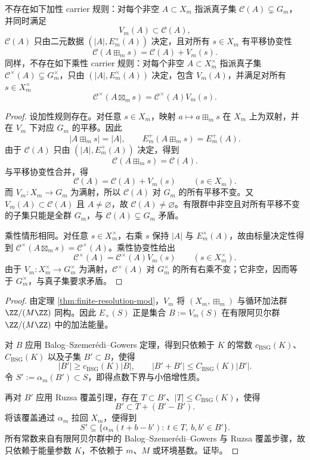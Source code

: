 \begin{proposition}[碰撞标量伪不变量剔除]\label{distill:breuillard_green_tao_approximate_groups_and_helfgott_growth-arithmetic_coincidence_to_model_theorem-collision-scalar-pseudoinvariant-elimination}
不存在如下加性 carrier 规则：对每个非空 \(A\subset X_m\) 指派真子集 \(\mathcal C(A)\subsetneq G_m\)，并同时满足
\[
V_m(A)\subset \mathcal C(A),
\]
\(\mathcal C(A)\) 只由二元数据 \((|A|,E_m^+(A))\) 决定，且对所有 \(s\in X_m\) 有平移协变性
\[
\mathcal C(A\boxplus_m s)=\mathcal C(A)+V_m(s).
\]
同样，不存在如下乘性 carrier 规则：对每个非空 \(A\subset X_m^\times\) 指派真子集 \(\mathcal C^\times(A)\subsetneq G_m^\times\)，只由 \((|A|,E_m^\times(A))\) 决定，包含 \(V_m(A)\)，并满足对所有 \(s\in X_m^\times\)
\[
\mathcal C^\times(A\boxtimes_m s)=\mathcal C^\times(A)V_m(s).
\]
\end{proposition}
\begin{proof}
设加性规则存在。对任意 \(s\in X_m\)，映射 \(a\mapsto a\boxplus_m s\) 在 \(X_m\) 上为双射，并在 \(V_m\) 下对应 \(G_m\) 的平移。因此
\[
|A\boxplus_m s|=|A|,\qquad E_m^+(A\boxplus_m s)=E_m^+(A).
\]
由于 \(\mathcal C(A)\) 只由 \((|A|,E_m^+(A))\) 决定，得到
\[
\mathcal C(A\boxplus_m s)=\mathcal C(A).
\]
与平移协变性合并，得
\[
\mathcal C(A)=\mathcal C(A)+V_m(s)\qquad(s\in X_m).
\]
而 \(V_m:X_m\to G_m\) 为满射，所以 \(\mathcal C(A)\) 对 \(G_m\) 的所有平移不变。又 \(V_m(A)\subset\mathcal C(A)\) 且 \(A\ne\varnothing\)，故 \(\mathcal C(A)\ne\varnothing\)。有限群中非空且对所有平移不变的子集只能是全群 \(G_m\)，与 \(\mathcal C(A)\subsetneq G_m\) 矛盾。

乘性情形相同。对任意 \(s\in X_m^\times\)，右乘 \(s\) 保持 \(|A|\) 与 \(E_m^\times(A)\)，故由标量决定性得到 \(\mathcal C^\times(A\boxtimes_m s)=\mathcal C^\times(A)\)。乘性协变性给出
\[
\mathcal C^\times(A)=\mathcal C^\times(A)V_m(s)\qquad(s\in X_m^\times).
\]
由于 \(V_m:X_m^\times\to G_m^\times\) 为满射，\(\mathcal C^\times(A)\) 对 \(G_m^\times\) 的所有右乘不变；它非空，因而等于 \(G_m^\times\)，与真子集要求矛盾。
\end{proof}

\begin{proof}
由定理 \ref{thm:finite-resolution-mod}，\(V_m\) 将 \((X_m,\boxplus_m)\) 与循环加法群 \(\ZZ/(M\ZZ)\) 同构。因此 \(E_+(S)\) 正是集合 \(B:=V_m(S)\) 在有限阿贝尔群 \(\ZZ/(M\ZZ)\) 中的加法能量。

对 \(B\) 应用 Balog--Szemer\'edi--Gowers 定理，得到只依赖于 \(K\) 的常数 \(c_{\mathrm{BSG}}(K)\)、\(C_{\mathrm{BSG}}(K)\) 以及子集 \(B'\subset B\)，使得
\[
|B'|\geq c_{\mathrm{BSG}}(K)|B|,
\qquad
|B'+B'|\leq C_{\mathrm{BSG}}(K)|B'|.
\]
令 \(S':=\alpha_m(B')\subset S\)，即得点数下界与小倍增性质。

再对 \(B'\) 应用 Ruzsa 覆盖引理，存在 \(T\subset B'\)、\(|T|\leq C_{\mathrm{BSG}}(K)\)，使得
\[
B'\subset T+(B'-B').
\]
将该覆盖通过 \(\alpha_m\) 拉回 \(X_m\)，便得到
\[
S'\subseteq
\{\alpha_m(t+b-b'):\ t\in T,\ b,b'\in B'\}.
\]
所有常数来自有限阿贝尔群中的 Balog--Szemer\'edi--Gowers 与 Ruzsa 覆盖步骤，故只依赖于能量参数 \(K\)，不依赖于 \(m\)、\(M\) 或环境基数。证毕。
\end{proof}

